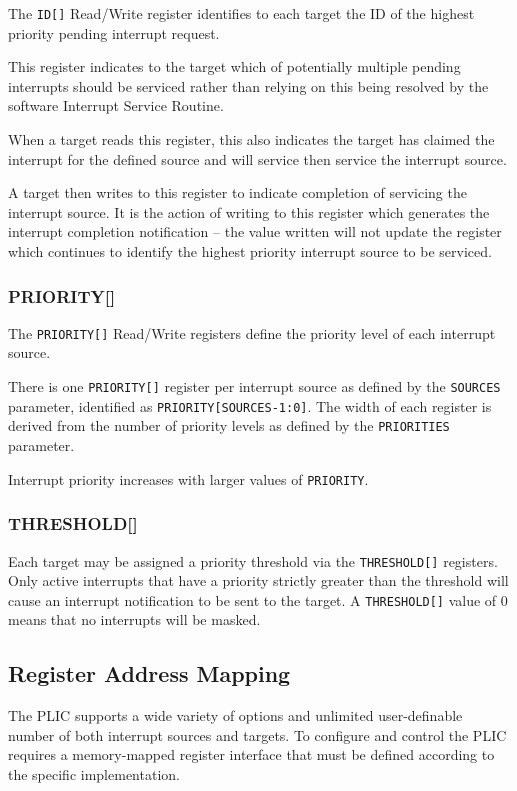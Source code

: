 The \texttt{ID[]} Read/Write register identifies to each target
the ID of the highest priority pending interrupt request.

This register indicates to the target which of potentially multiple
pending interrupts should be serviced rather than relying on this being
resolved by the software Interrupt Service Routine.

When a target reads this register, this also indicates the target has
claimed the interrupt for the defined source and will service then
service the interrupt source.

A target then writes to this register to indicate completion of
servicing the interrupt source. It is the action of writing to this
register which generates the interrupt completion notification -- the
value written will not update the register which continues to identify
the highest priority interrupt source to be serviced.

\subsubsection{PRIORITY[]}

The \texttt{PRIORITY[]} Read/Write registers define the priority level of each interrupt source.

There is one \texttt{PRIORITY[]} register per interrupt source as defined by the \texttt{SOURCES} parameter, identified as \texttt{PRIORITY[SOURCES-1:0]}. The width of each register is derived from the number of priority levels as defined by the \texttt{PRIORITIES} parameter.

Interrupt priority increases with larger values of \texttt{PRIORITY}.

\subsubsection{THRESHOLD[]}

Each target may be assigned a priority threshold via the
\texttt{THRESHOLD[]} registers. Only
active interrupts that have a priority strictly greater than the
threshold will cause an interrupt notification to be sent to the target.
A \texttt{THRESHOLD[]} value of 0
means that no interrupts will be masked.

\subsection{Register Address Mapping}

The PLIC supports a wide variety of options and unlimited user-definable
number of both interrupt sources and targets. To configure and control
the PLIC requires a memory-mapped register interface that must be
defined according to the specific implementation.

